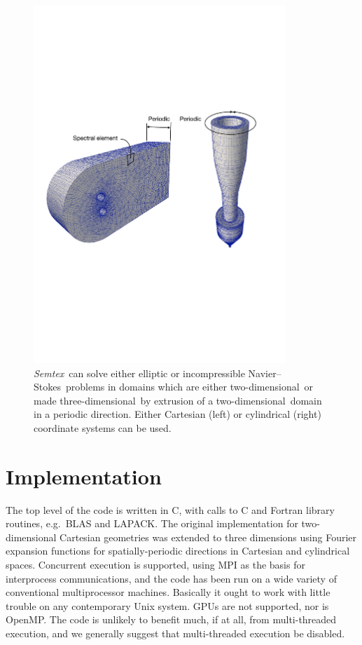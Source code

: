 \documentclass[11pt]{report}
\newcommand{\Semtex}{\emph{Semtex}} \newcommand{\Dog}{\emph{Dog}}
\newcommand\twod{two-di\-men\-sion\-al}
\newcommand\threed{three-di\-men\-sion\-al}
\newcommand{\eg}{e.g.\ } \newcommand{\CC}{\mathrm{c.c.}}
\newcommand\NavSto{Navier--Stokes}
\newcommand\cpp{C\nolinebreak\hspace{-.05em}\raisebox{.3ex}{\footnotesize\bf
+}\nolinebreak\hspace{-.10em}\raisebox{.3ex}{\footnotesize\bf+}}
\begin{document}
\begin{figure}
  \begin{center}
    \includegraphics[width=0.85\textwidth]{2+5DSemMesh}
  \end{center}
  \caption{ \Semtex\ can solve either elliptic or incompressible
    \NavSto\ problems in domains which are either \twod\ or made
    \threed\ by extrusion of a \twod\ domain in a periodic direction.
    Either Cartesian (left) or cylindrical (right) coordinate systems
    can be used.  }
  \label{fig.extrude}
\end{figure}


\section{Implementation}

The top level of the code is written in \cpp, with calls to C and
Fortran library routines, \eg BLAS and LAPACK. The original
implementation for two-dimensional Cartesian geometries was extended
to three dimensions using Fourier expansion functions for
spatially-periodic directions in Cartesian and cylindrical spaces.
Concurrent execution is supported, using MPI as the basis for
interprocess communications, and the code has been run on a wide
variety of conventional multiprocessor machines.  Basically it ought
to work with little trouble on any contemporary Unix system.  GPUs are
not supported, nor is OpenMP.  The code is unlikely to benefit much,
if at all, from multi-threaded execution, and we generally suggest
that multi-threaded execution be disabled.
\end{document}
